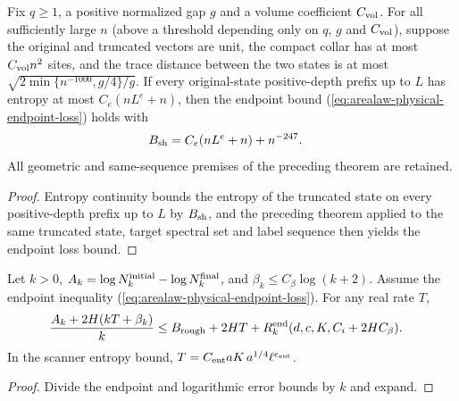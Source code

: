 \begin{lemma}
    \label{thm:arealaw-source-endpoint-loss}
    \leanok
    Fix $q\geq1$, a positive normalized gap $g$ and a volume coefficient
    $C_{\rm vol}$. For all sufficiently large $n$ (above a threshold
    depending only on $q$, $g$ and $C_{\rm vol}$), suppose the original and
    truncated vectors are unit, the compact collar has at most
    $C_{\rm vol}n^2$ sites, and the trace distance between the two states is
    at most $\sqrt{2\min\{n^{-1000},g/4\}/g}$. If every original-state
    positive-depth prefix up to $L$ has entropy at most
    $C_e(nL^e+n)$, then the endpoint bound
    (\ref{eq:arealaw-physical-endpoint-loss}) holds with
    \begin{align}
        B_{\rm sh} & =C_e(nL^e+n)+n^{-247}.
        \label{eq:arealaw-source-endpoint-shell}
    \end{align}
    All geometric and same-sequence premises of the preceding theorem
    are retained.
\end{lemma}
\begin{proof}
    \leanok
    Entropy continuity bounds the entropy of the truncated state on every
    positive-depth prefix up to $L$ by $B_{\rm sh}$, and the preceding
    theorem applied to the same truncated state, target spectral set and
    label sequence then yields the endpoint loss bound.
\end{proof}

\begin{lemma}
    \label{thm:arealaw-rough-selection-numerator}
    \leanok
    Let $k>0$, $A_k=\log N_k^{\rm initial}-\log N_k^{\rm final}$,
    and $\beta_k\leq C_\beta\log(k+2)$.  Assume the endpoint inequality
    (\ref{eq:arealaw-physical-endpoint-loss}).  For any real rate $T$,
    \begin{align}
        \frac{A_k+2H(kT+\beta_k)}k
         & \leq B_{\rm rough}+2HT+
        R_k^{\rm end}(d,c,K,C_i+2HC_\beta).
        \label{eq:arealaw-rough-selection-numerator}
    \end{align}
    In the scanner entropy bound,
    $T=C_{\rm ent}aK\,a^{1/4}\ell^{e_{\rm ent}}$.
\end{lemma}
\begin{proof}
    \leanok
    Divide the endpoint and logarithmic error bounds by $k$ and expand.
\end{proof}

